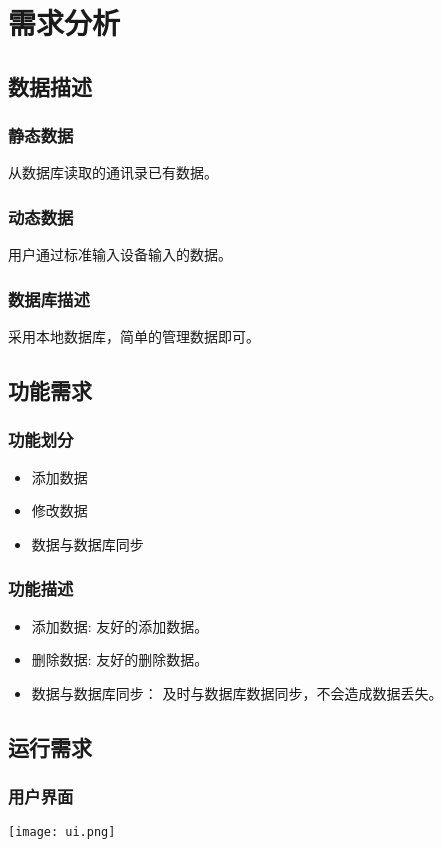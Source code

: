 \chapter{需求分析}
\section{数据描述}
	\subsection{静态数据}
		从数据库读取的通讯录已有数据。
	\subsection{动态数据}
		用户通过标准输入设备输入的数据。
	\subsection{数据库描述}
		采用本地数据库，简单的管理数据即可。
\section{功能需求}
	\subsection{功能划分}
		\begin{itemize}
			\item 添加数据
			\item 修改数据
			\item 数据与数据库同步
		\end{itemize}
	\subsection{功能描述}
		\begin{itemize}
			\item 添加数据: 友好的添加数据。
			\item 删除数据: 友好的删除数据。
			\item 数据与数据库同步： 及时与数据库数据同步，不会造成数据丢失。
		\end{itemize}
\section{运行需求}
	\subsection{用户界面}
		\texttt{[image: ui.png]}
